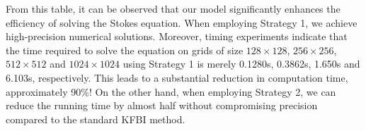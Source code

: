 \documentclass{article}
\begin{document}
From this table, it can be observed that our model significantly enhances the efficiency of solving the Stokes equation. When employing Strategy 1, we achieve high-precision numerical solutions. Moreover, timing experiments indicate that the time required to solve the equation on grids of size $128\times128$, $256\times256$, $512 \times 512$ and $1024 \times 1024$ using Strategy 1 is merely 0.1280s, 0.3862s, 1.650s and 6.103s, respectively. This leads to a substantial reduction in computation time, approximately 90\%! On the other hand, when employing Strategy 2, we can reduce the running time by almost half without compromising precision compared to the standard KFBI method.
\end{document}
